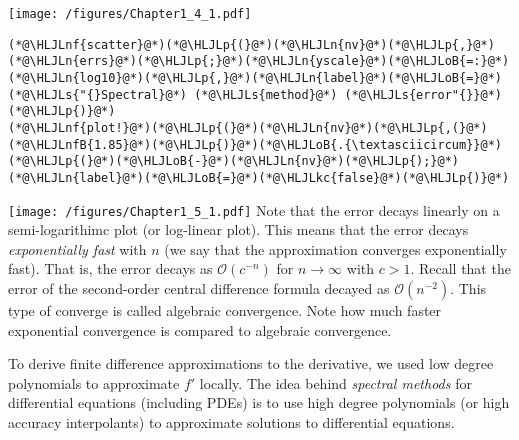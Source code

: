 \documentclass[12pt,landscape]{article}
\newcommand{\HLJLkc}[1]{\textcolor[RGB]{59,151,46}{\textit{#1}}}
\newcommand{\HLJLn}[1]{#1}
\newcommand{\HLJLnf}[1]{\textcolor[RGB]{66,102,213}{#1}}
\newcommand{\HLJLs}[1]{\textcolor[RGB]{201,61,57}{#1}}
\newcommand{\HLJLnfB}[1]{\textcolor[RGB]{59,151,46}{#1}}
\newcommand{\HLJLoB}[1]{\textcolor[RGB]{102,102,102}{\textbf{#1}}}
\newcommand{\HLJLp}[1]{#1}
\begin{document}
{\texttt{[image: /figures/Chapter1\_4\_1.pdf]}

\begin{lstlisting}
(*@\HLJLnf{scatter}@*)(*@\HLJLp{(}@*)(*@\HLJLn{nv}@*)(*@\HLJLp{,}@*)(*@\HLJLn{errs}@*)(*@\HLJLp{;}@*)(*@\HLJLn{yscale}@*)(*@\HLJLoB{=:}@*)(*@\HLJLn{log10}@*)(*@\HLJLp{,}@*)(*@\HLJLn{label}@*)(*@\HLJLoB{=}@*)(*@\HLJLs{"{}Spectral}@*) (*@\HLJLs{method}@*) (*@\HLJLs{error"{}}@*)(*@\HLJLp{)}@*)
(*@\HLJLnf{plot!}@*)(*@\HLJLp{(}@*)(*@\HLJLn{nv}@*)(*@\HLJLp{,(}@*)(*@\HLJLnfB{1.85}@*)(*@\HLJLp{)}@*)(*@\HLJLoB{.{\textasciicircum}}@*)(*@\HLJLp{(}@*)(*@\HLJLoB{-}@*)(*@\HLJLn{nv}@*)(*@\HLJLp{);}@*)(*@\HLJLn{label}@*)(*@\HLJLoB{=}@*)(*@\HLJLkc{false}@*)(*@\HLJLp{)}@*)
\end{lstlisting}

\texttt{[image: /figures/Chapter1\_5\_1.pdf]}
\newpage
Note that the error decays linearly on a semi-logarithimc plot (or log-linear plot).  This means that the error decays \emph{exponentially fast} with $n$ (we say that the approximation converges exponentially fast).  That is, the error decays as $\mathcal{O}(c^{-n})$ for $n \to \infty$ with $c > 1$.  Recall that the error of the second-order central difference formula decayed as $\mathcal{O}(n^{-2})$.  This type of converge is  called algebraic convergence.  Note how much faster exponential convergence is compared to algebraic convergence.

To derive finite difference approximations to the derivative, we used low degree polynomials to approximate $f'$ locally.  The idea behind \emph{spectral methods} for differential equations (including PDEs) is to use high degree polynomials (or high accuracy interpolants) to approximate solutions to differential equations.


}
\end{document}

